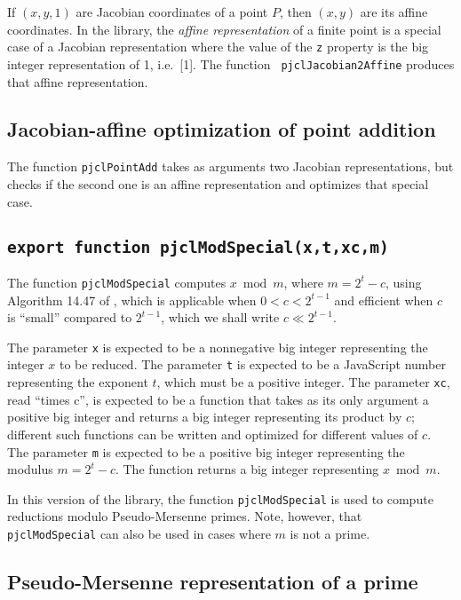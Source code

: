 \documentclass[12pt]{article}
\begin{document}
If $(x,y,1)$ are Jacobian coordinates of a point $P$, then $(x,y)$ are
its affine coordinates.  In the library, the {\em affine
  representation\/} of a finite point is a special case of a Jacobian
representation where the value of the {\tt z} property is the big
integer representation of 1, i.e.\ [1].  The function {\tt
  pjclJacobian2Affine} produces that affine representation.  

\subsection{Jacobian-affine optimization of point addition}
\label{s:jacobian-affine-optimization}

The function {\tt pjclPointAdd} takes as arguments two Jacobian
representations, but checks if the second one is an affine
representation and optimizes that special case.

\subsection{\tt export function pjclModSpecial(x,t,xc,m)}

The function {\tt pjclModSpecial} computes $x \bmod m$, where
$m=2^t-c$, using Algorithm 14.47 of \cite{Menezes97handbookof}, which
is applicable when $0 < c < 2^{t-1}$ and efficient when $c$ is ``small''
compared to $2^{t-1}$, which we shall write $c \ll 2^{t-1}$.  

The parameter {\tt x} is expected to be a nonnegative big integer representing the
integer $x$ to be reduced.  The parameter {\tt t} is
expected to be a JavaScript number representing the exponent $t$, which must be a positive integer.
The parameter {\tt xc}, read ``times c'', is expected to be a function
that takes as its only argument a positive big integer and returns a
big integer representing its product by $c$; different such functions can be
written and optimized for different values of $c$.  The parameter {\tt m} is
expected to be a positive big integer representing the modulus $m = 2^t - c$.
The function returns a big integer representing $x \bmod m$.

In this version of the library, the function {\tt pjclModSpecial} is
used to compute reductions modulo Pseudo-Mersenne primes.  Note,
however, that {\tt pjclModSpecial} can also be used in cases where $m$
is not a prime.

\subsection{Pseudo-Mersenne representation of a prime}
\label{s:pseudo-mersenne}
\end{document}
